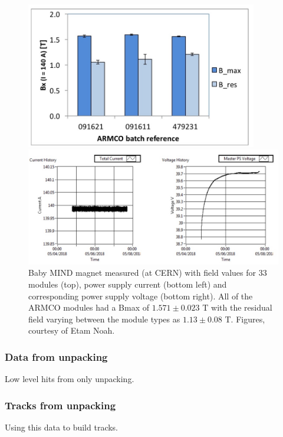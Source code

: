 \begin{figure}[h!]
\centering
\includegraphics[width=0.9\textwidth]{figures/magnetFigure1.jpeg}

\includegraphics[width=\textwidth]{figures/magnetFigure2.jpeg}
\caption{Baby MIND magnet measured (at CERN) with field values for 33 modules (top), power supply current (bottom left) and corresponding power supply voltage (bottom right). All of the ARMCO modules had a Bmax of $1.571 \pm 0.023$ T with the residual field varying between the module types as $1.13 \pm  0.08 $ T. Figures, courtesy of Etam Noah.}
\label{fig:Magnetplot1}
\end{figure}



\subsubsection{Data from unpacking}
Low level hits from only unpacking.

\subsubsection{Tracks from unpacking}
Using this data to build tracks.
\fi

